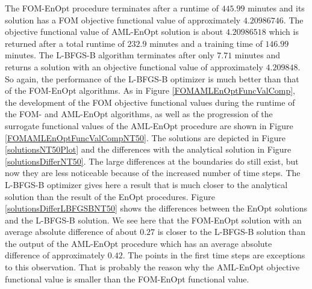 The FOM-EnOpt procedure terminates after a runtime of $445.99$ minutes and its solution has a FOM objective functional value of approximately $4.20986746$. The objective functional value of AML-EnOpt solution is about $4.20986518$ which is returned after a total runtime of $232.9$ minutes and a training time of $146.99$ minutes. The L-BFGS-B algorithm terminates after only $7.71$ minutes and returns a solution with an objective functional value of approximately $4.209848$. So again, the performance of the L-BFGS-B optimizer is much better than that of the FOM-EnOpt algorithms. As in Figure \ref{FOMAMLEnOptFuncValComp}, the development of the FOM objective functional values during the runtime of the FOM- and AML-EnOpt algorithms, as well as the progression of the surrogate functional values of the AML-EnOpt procedure are shown in Figure \ref{FOMAMLEnOptFuncValCompNT50}. The solutions are depicted in Figure \ref{solutionsNT50Plot} and the differences with the analytical solution in Figure \ref{solutionsDifferNT50}. The large differences at the boundaries do still exist, but now they are less noticeable because of the increased number of time steps. The L-BFGS-B optimizer gives here a result that is much closer to the analytical solution than the result of the EnOpt procedures. Figure \ref{solutionsDifferLBFGSBNT50} shows the differences between the EnOpt solutions and the L-BFGS-B solution. We see here that the FOM-EnOpt solution with an average absolute difference of about $0.27$ is closer to the L-BFGS-B solution than the output of the AML-EnOpt procedure which has an average absolute difference of approximately $0.42$. The points in the first time steps are exceptions to this observation. That is probably the reason why the AML-EnOpt objective functional value is smaller than the FOM-EnOpt functional value.

